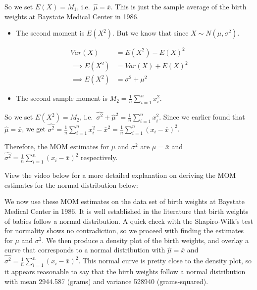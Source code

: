 \documentclass[
]{book}
\newenvironment{Shaded}{\begin{snugshade}}{\end{snugshade}}
\newcommand{\DocumentationTok}[1]{\textcolor[rgb]{0.56,0.35,0.01}{\textbf{\textit{#1}}}}
\newcommand{\FunctionTok}[1]{\textcolor[rgb]{0.13,0.29,0.53}{\textbf{#1}}}
\newcommand{\NormalTok}[1]{#1}
\newcommand{\OtherTok}[1]{\textcolor[rgb]{0.56,0.35,0.01}{#1}}
\newcommand{\SpecialCharTok}[1]{\textcolor[rgb]{0.81,0.36,0.00}{\textbf{#1}}}
\providecommand{\tightlist}{%
  \setlength{\itemsep}{0pt}\setlength{\parskip}{0pt}}
\begin{document}
So we set \(E(X) = M_1\), i.e.~\(\hat{\mu} = \bar{x}\). This is just the sample average of the birth weights at Baystate Medical Center in 1986.

\begin{itemize}
\tightlist
\item
  The second moment is \(E(X^2)\). But we know that since \(X \sim N(\mu, \sigma^2)\).
\end{itemize}

\[
\begin{split}
Var(X) &= E(X^2) - E(X)^2\\
\implies E(X^2) &= Var(X) + E(X)^2 \\
\implies E(X^2) &= \sigma^2 + \mu^2
\end{split}
\]

\begin{itemize}
\tightlist
\item
  The second sample moment is \(M_2 = \frac{1}{n} \sum_{i=1}^n x_i^2\).
\end{itemize}

So we set \(E(X^2) = M_2\), i.e.~\(\hat{\sigma^2} + \hat{\mu}^2 = \frac{1}{n} \sum_{i=1}^n x_i^2\). Since we earlier found that \(\hat{\mu} = \bar{x}\), we get \(\hat{\sigma^2}  = \frac{1}{n} \sum_{i=1}^n x_i^2 - \bar{x}^2 = \frac{1}{n} \sum_{i=1}^n (x_i - \bar{x})^2\).

Therefore, the MOM estimates for \(\mu\) and \(\sigma^2\) are \(\hat{\mu} = \bar{x}\) and \(\hat{\sigma^2}  = \frac{1}{n} \sum_{i=1}^n (x_i - \bar{x})^2\) respectively.

View the video below for a more detailed explanation on deriving the MOM estimates for the normal distribution below:

We now use these MOM estimates on the data set of birth weights at Baystate Medical Center in 1986. It is well established in the literature that birth weights of babies follow a normal distribution. A quick check with the Shapiro-Wilk's test for normality shows no contradiction, so we proceed with finding the estimates for \(\mu\) and \(\sigma^2\). We then produce a density plot of the birth weights, and overlay a curve that corresponds to a normal distribution with \(\hat{\mu} = \bar{x}\) and \(\hat{\sigma^2}  = \frac{1}{n} \sum_{i=1}^n (x_i - \bar{x})^2\). This normal curve is pretty close to the density plot, so it appears reasonable to say that the birth weights follow a normal distribution with mean 2944.587 (grams) and variance 528940 (grams-squared).

\begin{Shaded}
\end{Shaded}
\end{document}
